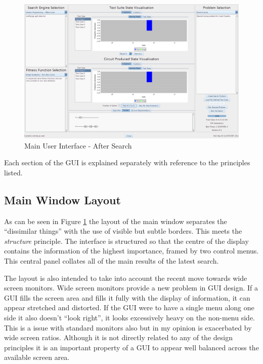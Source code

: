 \begin{figure}
 \includegraphics[width=\textwidth]{GUIDesign.png}
\caption{Main User Interface - After Search}
\label{fig:MainGUIDesign}
\end{figure}

Each section of the GUI is explained separately with reference to the principles listed.

\subsection{Main Window Layout}
As can be seen in Figure \ref{fig:MainGUIDesign} the layout of the main window separates the ``dissimilar things'' with the use of visible but subtle borders.
This meets the \emph{structure} principle.
The interface is structured so that the centre of the display contains the information of the highest importance, framed  by two control menus.
This central panel collates all of the main results of the latest search.

The layout is also intended to take into account the recent move towards wide screen monitors.
Wide screen monitors provide a new problem in GUI design.
If a GUI fills the screen area and fills it fully with the display of information, it can appear stretched and distorted.
If the GUI were to have a single menu along one side it also doesn't ``look right'', it looks excessively heavy on the non-menu side.
This is a issue with standard monitors also but in my opinion is exacerbated by wide screen ratios.
Although it is not directly related to any of the design principles it is an important property of a GUI to appear well balanced across the available screen area.

